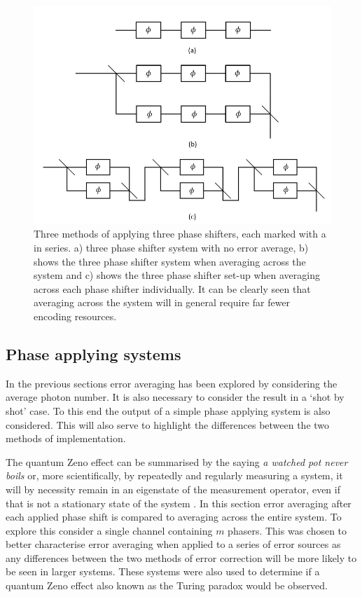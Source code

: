\documentclass[aps,pra,twocolumn,superscriptaddress,numerical]{revtex4-1}
\begin{document}
		\begin{figure}
			\includegraphics[width=\columnwidth]{three_phase_applying_systems.PNG}
			
			\caption{Three methods of applying three phase shifters, each marked with a
				in series. a) three phase shifter system with no error average, b)
				shows the three phase shifter system when averaging across the system
				and c) shows the three phase shifter set-up when averaging across
				each phase shifter individually. It can be clearly seen that averaging
				across the system will in general require far fewer encoding resources.
				\label{fig:Different methods of implementation}}
			
			
		\end{figure}
		
		\subsection{Phase applying systems\label{Phase applying systems}}
		In the previous sections error averaging has been explored by considering the average photon number. It is also necessary to consider the result in a `shot by shot' case. To this end the output of a simple phase applying system is also considered. This will also serve to highlight the differences between the two methods of implementation.
		
		The quantum Zeno effect can be summarised by the saying \textit{a watched pot never boils} or, more scientifically, by repeatedly and regularly measuring a system, it will by necessity remain in an eigenstate of the measurement operator, even if that is not a stationary state of the system \cite{expZeno}. In this section error averaging after each applied phase shift is compared to averaging across the entire system. To explore this consider a single channel containing $m$ phasers. This was chosen to better characterise error averaging when applied to a series of error sources as any differences between the two methods of error correction will be more likely to be seen in larger systems. These systems were also used to determine if a quantum Zeno effect also known as the Turing paradox would be observed.
		
\end{document}
